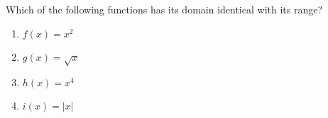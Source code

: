 \bigskip

\item Which of the following functions has its domain identical with its range?

\begin{enumerate}
\item $f(x) = x^2$
\item $g(x)  = \sqrt{x}$
\item $h(x) = x^4$
\item $i(x) = |x|$
\end{enumerate}

